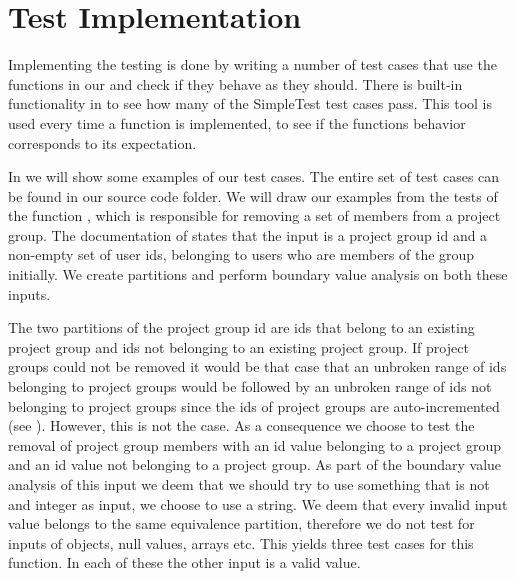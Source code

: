 \section{Test Implementation}
\label{sec:testimplementation}
Implementing the testing is done by writing a number of test cases that use the functions in our \subsystem{} and check if they behave as they should.
There is built-in functionality in \moodle{} to see how many of the SimpleTest test cases pass.
This tool is used every time a function is implemented, to see if the functions behavior corresponds to its expectation.

In  we will show some examples of our test cases.
The entire set of test cases can be found in our source code folder.
We will draw our examples from the tests of the function , which is responsible for removing a set of members from a project group.
The documentation of  states that the input is a project group id and a non-empty set of user ids, belonging to users who are members of the group initially.
We create partitions and perform boundary value analysis on both these inputs.

The two partitions of the project group id are ids that belong to an existing project group and ids not belonging to an existing project group.
If project groups could not be removed it would be that case that an unbroken range of ids belonging to project groups would be followed by an unbroken range of ids not belonging to project groups since the ids of project groups are auto-incremented (see ).
However, this is not the case.
As a consequence we choose to test the removal of project group members with an id value belonging to a project group and an id value not belonging to a project group.
As part of the boundary value analysis of this input we deem that we should try to use something that is not and integer as input, we choose to use a string.
We deem that every invalid input value belongs to the same equivalence partition, therefore we do not test for inputs of objects, null values, arrays etc.
This yields three test cases for this function.
In each of these the other input is a valid value.

